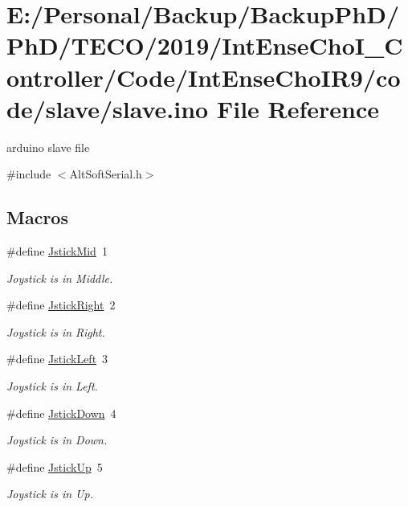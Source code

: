 \hypertarget{slave_8ino}{}\section{E\+:/\+Personal/\+Backup/\+Backup\+Ph\+D/\+Ph\+D/\+T\+E\+C\+O/2019/\+Int\+Ense\+Cho\+I\+\_\+\+Controller/\+Code/\+Int\+Ense\+Cho\+I\+R9/code/slave/slave.ino File Reference}
\label{slave_8ino}


arduino slave file  


{\ttfamily \#include $<$Alt\+Soft\+Serial.\+h$>$}\newline
\subsection*{Macros}
\begin{DoxyCompactItemize}
\item 
\mbox{\label{slave_8ino_ac4a0d1542e118f06f6f0997629d9ab84}} 
\#define \mbox{\hyperlink{slave_8ino_ac4a0d1542e118f06f6f0997629d9ab84}{Jstick\+Mid}}~1
\begin{DoxyCompactList}\small\item\em Joystick is in Middle. \end{DoxyCompactList}\item 
\mbox{\label{slave_8ino_a9b93a0effb9c09248bcba85a28c48b8d}} 
\#define \mbox{\hyperlink{slave_8ino_a9b93a0effb9c09248bcba85a28c48b8d}{Jstick\+Right}}~2
\begin{DoxyCompactList}\small\item\em Joystick is in Right. \end{DoxyCompactList}\item 
\mbox{\label{slave_8ino_ad0d7429c7c26609751ca64fa94acb32c}} 
\#define \mbox{\hyperlink{slave_8ino_ad0d7429c7c26609751ca64fa94acb32c}{Jstick\+Left}}~3
\begin{DoxyCompactList}\small\item\em Joystick is in Left. \end{DoxyCompactList}\item 
\mbox{\label{slave_8ino_acc8a88b497450472b81c5f95b9c3a605}} 
\#define \mbox{\hyperlink{slave_8ino_acc8a88b497450472b81c5f95b9c3a605}{Jstick\+Down}}~4
\begin{DoxyCompactList}\small\item\em Joystick is in Down. \end{DoxyCompactList}\item 
\mbox{\label{slave_8ino_a74824f5ea0f46df119320d99c9c287f3}} 
\#define \mbox{\hyperlink{slave_8ino_a74824f5ea0f46df119320d99c9c287f3}{Jstick\+Up}}~5
\begin{DoxyCompactList}\small\item\em Joystick is in Up. \end{DoxyCompactList}\end{DoxyCompactItemize}
